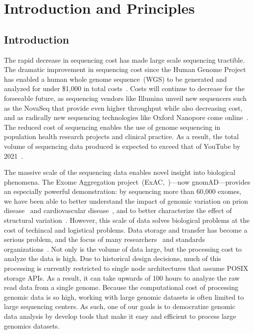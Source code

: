 \documentclass[phd]{ucbthesis}
\begin{document}
\mainmatter

\part{Introduction and Principles}

\chapter{Introduction}
\label{chap:introduction}

The rapid decrease in sequencing cost has made large scale sequencing
tractible. The dramatic improvement in sequencing cost since the Human
Genome Project has enabled a human whole genome sequence~(WGS) to be
generated and analyzed for under \$1,000 in total costs~\cite{nhgri}. Costs
will continue to decrease for the forseeable future, as sequencing vendors like
Illumina unveil new sequencers such as the NovaSeq that provide even
higher throughput while also decreasing cost, and as radically new
sequencing technologies like Oxford Nanopore come online~\cite{jain17}.
The reduced cost of sequencing enables the use of genome sequencing in
population health research projects and clinical practice. As a result,
the total volume of sequencing data produced is expected to exceed that
of YouTube by 2021~\cite{stephens15}.

The massive scale of the sequencing data enables
novel insight into biological phenomena. The Exome Aggregation
project~(ExAC,~\cite{lek16})---now gnomAD---provides an especially powerful
demonstration: by sequencing more than 60,000 exomes, we have been able
to better understand the impact of genomic variation on prion
disease~\cite{minikel16} and cardiovascular disease~\cite{walsh16}, and to
better characterize the effect of structural variation~\cite{ruderfer16}.
However, this scale of data solves biological problems at the cost of techincal
and logistical problems. Data storage and transfer has become a serious problem,
and the focus of many researchers~\cite{fritz11, kozanitis11} and standards
organizations~\cite{paten15}. Not only is the volume of data large, but
the processing cost to analyze the data is high. Due to historical design
decisions, much of this processing is currently restricted to single node
architectures that assume POSIX storage APIs. As a result, it can take
upwards of 100 hours to analyze the raw read data from a single genome.
Because the computational cost of processing genomic data is so high, working
with large genomic datasets is often limited to large sequencing centers. As
such, one of our goals is to democratize genomic data analysis by develop tools
that make it easy and efficient to process large genomics datasets.
\end{document}
